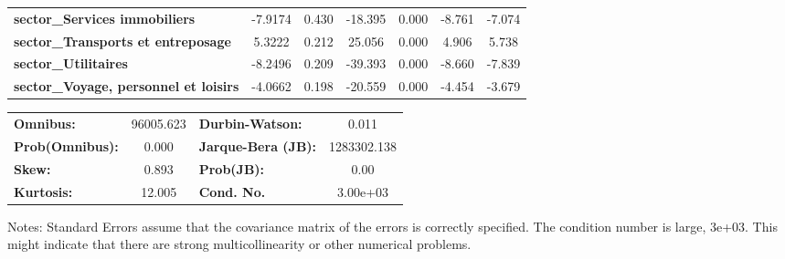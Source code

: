 \begin{center}
\begin{tabular}{lcccccc}
\textbf{sector\_Services immobiliers}                                 &      -7.9174  &        0.430     &   -18.395  &         0.000        &       -8.761    &       -7.074     \\
\textbf{sector\_Transports et entreposage}                            &       5.3222  &        0.212     &    25.056  &         0.000        &        4.906    &        5.738     \\
\textbf{sector\_Utilitaires}                                          &      -8.2496  &        0.209     &   -39.393  &         0.000        &       -8.660    &       -7.839     \\
\textbf{sector\_Voyage, personnel et loisirs}                         &      -4.0662  &        0.198     &   -20.559  &         0.000        &       -4.454    &       -3.679     \\
\bottomrule
\end{tabular}
\begin{tabular}{lclc}
\textbf{Omnibus:}       & 96005.623 & \textbf{  Durbin-Watson:     } &      0.011   \\
\textbf{Prob(Omnibus):} &    0.000  & \textbf{  Jarque-Bera (JB):  } & 1283302.138  \\
\textbf{Skew:}          &    0.893  & \textbf{  Prob(JB):          } &       0.00   \\
\textbf{Kurtosis:}      &   12.005  & \textbf{  Cond. No.          } &   3.00e+03   \\
\bottomrule
\end{tabular}
\end{center}

Notes: \newline
 [1] Standard Errors assume that the covariance matrix of the errors is correctly specified. \newline
 [2] The condition number is large,  3e+03. This might indicate that there are \newline
 strong multicollinearity or other numerical problems.